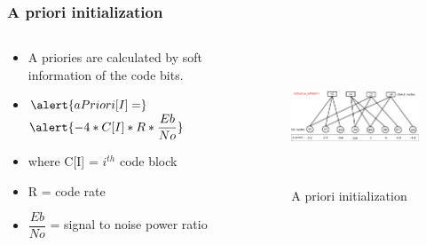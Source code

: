 \documentclass[xcolor=dvipsname]
{beamer}
\begin{document}
\begin{frame}[t]
\frametitle{ A priori initialization }  
\begin{columns}[totalwidth=\textwidth]
	\begin{column}{0.4\textwidth}
	\centering
	\begin{itemize}
	\item A priories are calculated by soft information of the code bits.	
	\item 	$
	\alert{aPriori[I] =}
	$
	$
	\alert{ -4 * C[I] * R * \dfrac{Eb}{No}}
	$ 
	\item where C[I] = $i^{th}$ code block
	\item R = code rate
	\item $\dfrac{Eb}{No}$ = signal to noise power ratio
	\end{itemize}
 
			
	\end{column}%
	   		
	\begin{column}{0.6\textwidth}
	\centering
	\begin{figure}
	\includegraphics[height=4cm,width=7cm]{minSum2}
	\caption{ A priori initialization }
	\end{figure}
	\end{column}%
\end{columns}
\end{frame}
\end{document}
